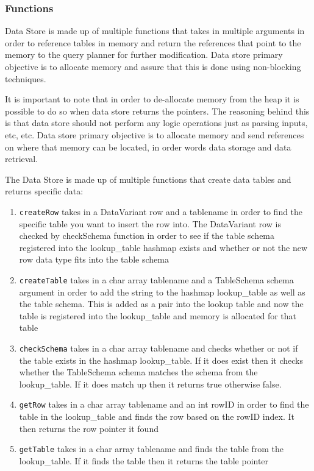 \documentclass[letterpaper, 12pt]{article}
\newcommand{\inlinecode}[1]{\colorbox{codegrey}{\lstinline[language=C++]{#1}}}
\begin{document}
\newpage
\subsubsection{Functions}
	Data Store is made up of multiple functions that takes in multiple arguments in order to reference tables in memory and return the references that point to the memory to the query planner for further modification. Data store primary objective is to allocate memory and assure that this is done using non-blocking techniques. 
	\par\vspace{\baselineskip}
	
	It is important to note that in order to de-allocate memory from the heap it is possible to do so when data store returns the pointers. The reasoning behind this is that data store should not perform any logic operations just as parsing inputs, etc, etc. Data store primary objective is to allocate memory and send references on where that memory can be located, in order words data storage and data retrieval. 
	\par\vspace{\baselineskip}
	The Data Store is made up of multiple functions that create data tables and returns specific data: 
	
	\begin{enumerate}
		\item \inlinecode{createRow} takes in a DataVariant row and a tablename in order to find the specific table
		you want to insert the row into. The DataVariant row is checked by checkSchema function in
		order to see if the table schema registered into the lookup\_table hashmap exists and whether
		or not the new row data type fits into the table schema
		\item \inlinecode{createTable} takes in a char array tablename and a TableSchema schema argument in order to add
		the string to the hashmap lookup{\_}table as well as the table schema. This is added as a pair
		into the lookup table and now the table is registered into the lookup{\_}table and memory is allocated
		for that table
		\item \inlinecode{checkSchema} takes in a char array tablename and checks whether or not if the table exists in the
		hashmap lookup{\_}table. If it does exist then it checks whether the TableSchema schema matches the
		schema from the lookup{\_}table. If it does match up then it returns true otherwise false.
		\item \inlinecode{getRow} takes in a char array tablename and an int rowID in order to find the table in the lookup{\_}table
		and finds the row based on the rowID index. It then returns the row pointer it found
		\item \inlinecode{getTable} takes in a char array tablename and finds the table from the lookup\_table. If it finds the table
		then it returns the table pointer
	\end{enumerate}
\end{document}
